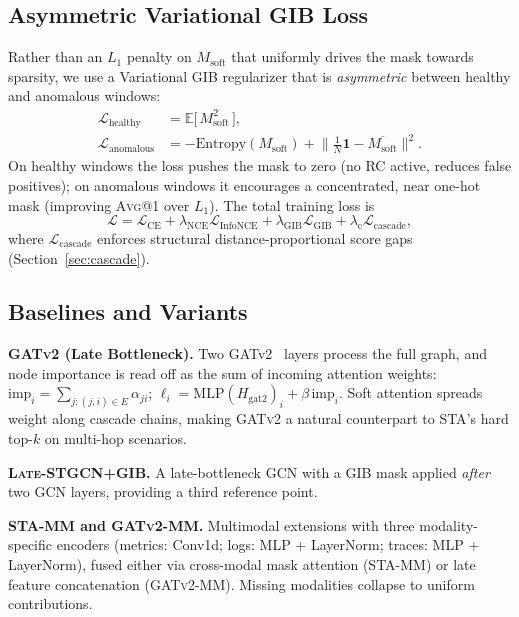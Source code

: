 \documentclass[11pt,a4paper]{article}
\makeatletter
\newcommand{\Avg}[1]{\textsc{Avg}@{#1}}
\newcommand{\STA}{\textsc{STA}}
\newcommand{\GATv}{\textsc{GATv2}}
\newcommand{\Late}{\textsc{Late-STGCN+GIB}}
\makeatother
\begin{document}
\subsection{Asymmetric Variational GIB Loss}
\label{sec:vgib}

Rather than an $L_1$ penalty on $M_{\mathrm{soft}}$ that uniformly drives the
mask towards sparsity, we use a Variational GIB regularizer that is
\emph{asymmetric} between healthy and anomalous windows:
\begin{align}
  \mathcal{L}_{\mathrm{healthy}}    &= \mathbb{E}\big[\,M_{\mathrm{soft}}^{2}\,\big], \\
  \mathcal{L}_{\mathrm{anomalous}}  &= -\mathrm{Entropy}(M_{\mathrm{soft}})
                                       + \big\lVert \tfrac{1}{N}\mathbf{1} - \overline{M_{\mathrm{soft}}}\big\rVert^{2}.
\end{align}
On healthy windows the loss pushes the mask to zero (no RC active, reduces
false positives); on anomalous windows it encourages a concentrated, near
one-hot mask (improving \Avg{1} over $L_1$). The total training loss is
\begin{equation}
  \mathcal{L} = \mathcal{L}_{\mathrm{CE}}
              + \lambda_{\mathrm{NCE}} \mathcal{L}_{\mathrm{InfoNCE}}
              + \lambda_{\mathrm{GIB}} \mathcal{L}_{\mathrm{GIB}}
              + \lambda_{\mathrm{c}}   \mathcal{L}_{\mathrm{cascade}},
\end{equation}
where $\mathcal{L}_{\mathrm{cascade}}$ enforces structural distance-proportional
score gaps (Section~\ref{sec:cascade}).

\subsection{Baselines and Variants}
\label{sec:baselines}

\textbf{\GATv{} (Late Bottleneck).} Two GATv2~\cite{brody2022gatv2} layers
process the full graph, and node importance is read off as the sum of
incoming attention weights:
$\text{imp}_i = \sum_{j:(j,i)\in E}\alpha_{ji}$; $\ell_i = \mathrm{MLP}(H_{\mathrm{gat2}})_i + \beta\,\text{imp}_i$.
Soft attention spreads weight along cascade chains, making \GATv{} a natural
counterpart to \STA{}'s hard top-$k$ on multi-hop scenarios.

\textbf{\Late{}.} A late-bottleneck GCN with a GIB mask applied \emph{after}
two GCN layers, providing a third reference point.

\textbf{\STA{}-MM and \GATv{}-MM.} Multimodal extensions with three
modality-specific encoders (metrics: Conv1d; logs: MLP + LayerNorm; traces:
MLP + LayerNorm), fused either via cross-modal mask attention (\STA{}-MM) or
late feature concatenation (\GATv{}-MM). Missing modalities collapse to
uniform contributions.
\end{document}

